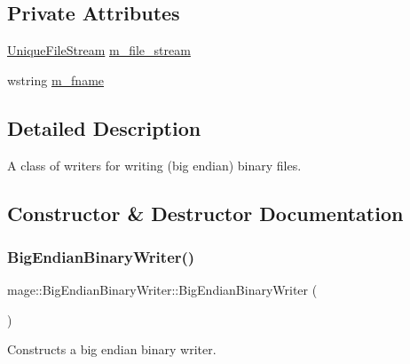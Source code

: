 \subsection*{Private Attributes}
\begin{DoxyCompactItemize}
\item 
\mbox{\hyperlink{namespacemage_a0ee1bd45ad7dbb3dc8c8e1770e3538d4}{Unique\+File\+Stream}} \mbox{\hyperlink{classmage_1_1_big_endian_binary_writer_ad2cdbdca429d6c351a57b51d175ffb55}{m\+\_\+file\+\_\+stream}}
\item 
wstring \mbox{\hyperlink{classmage_1_1_big_endian_binary_writer_a5bf83b685bfce080f55458bdca2e698a}{m\+\_\+fname}}
\end{DoxyCompactItemize}


\subsection{Detailed Description}
A class of writers for writing (big endian) binary files. 

\subsection{Constructor \& Destructor Documentation}
\mbox{\label{classmage_1_1_big_endian_binary_writer_ac0917b684913834577d4850269a6c09a}} 
\subsubsection{\texorpdfstring{Big\+Endian\+Binary\+Writer()}{BigEndianBinaryWriter()}\hspace{0.1cm}{\footnotesize\ttfamily [1/3]}}
{\footnotesize\ttfamily mage\+::\+Big\+Endian\+Binary\+Writer\+::\+Big\+Endian\+Binary\+Writer (\begin{DoxyParamCaption}{ }\end{DoxyParamCaption})\hspace{0.3cm}{\ttfamily [protected]}}

Constructs a big endian binary writer. \mbox{\label{classmage_1_1_big_endian_binary_writer_aafe65752342b2740e7293878ae469d9f}} 
